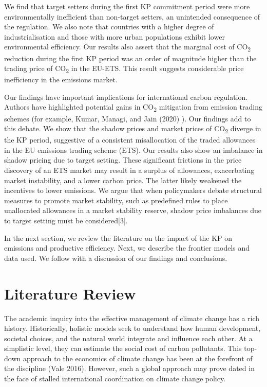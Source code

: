 \documentclass[
  letterpaper,
  DIV=11,
  numbers=noendperiod]{scrartcl}
\begin{document}
We find that target setters during the first KP commitment period were
more environmentally inefficient than non-target setters, an unintended
consequence of the regulation. We also note that countries with a higher
degree of industrialisation and those with more urban populations
exhibit lower environmental efficiency. Our results also assert that the
marginal cost of CO\textsubscript{2} reduction during the first KP
period was an order of magnitude higher than the trading price of
CO\textsubscript{2} in the EU-ETS. This result suggests considerable
price inefficiency in the emissions market.

Our findings have important implications for international carbon
regulation. Authors have highlighted potential gains in
CO\textsubscript{2} mitigation from emission trading schemes (for
example, Kumar, Managi, and Jain (2020) ). Our findings add to this
debate. We show that the shadow prices and market prices of
CO\textsubscript{2} diverge in the KP period, suggestive of a consistent
misallocation of the traded allowances in the EU emissions trading
scheme (ETS). Our results also show an imbalance in shadow pricing due
to target setting. These significant frictions in the price discovery of
an ETS market may result in a surplus of allowances, exacerbating market
instability, and a lower carbon price. The latter likely weakened the
incentives to lower emissions. We argue that when policymakers debate
structural measures to promote market stability, such as predefined
rules to place unallocated allowances in a market stability reserve,
shadow price imbalances due to target setting must be considered{[}3{]}.

In the next section, we review the literature on the impact of the KP on
emissions and productive efficiency. Next, we describe the frontier
models and data used. We follow with a discussion of our findings and
conclusions.

\hypertarget{literature-review}{%
\section{Literature Review}\label{literature-review}}

The academic inquiry into the effective management of climate change has
a rich history. Historically, holistic models seek to understand how
human development, societal choices, and the natural world integrate and
influence each other. At a simplistic level, they can estimate the
social cost of carbon pollutants. This top-down approach to the
economics of climate change has been at the forefront of the discipline
(Vale 2016). However, such a global approach may prove dated in the face
of stalled international coordination on climate change policy.
\end{document}

